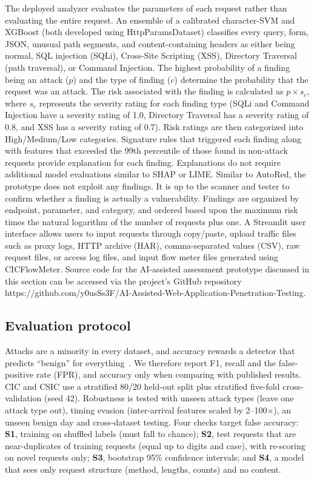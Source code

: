 \documentclass[conference]{IEEEtran}
\begin{document}
The deployed analyzer evaluates the parameters of each request rather than evaluating the entire request. An ensemble of a calibrated character-SVM and XGBoost (both developed using HttpParamsDataset) classifies every query, form, JSON, unusual path segments, and content-containing headers as either being normal, SQL injection (SQLi), Cross-Site Scripting (XSS), Directory Traversal (path traversal), or Command Injection. The highest probability of a finding being an attack ($p$) and the type of finding ($c$) determine the probability that the request was an attack. The risk associated with the finding is calculated as $p \times s_c$, where $s_c$ represents the severity rating for each finding type (SQLi and Command Injection have a severity rating of 1.0, Directory Traversal has a severity rating of 0.8, and XSS has a severity rating of 0.7). Risk ratings are then categorized into High/Medium/Low categories. Signature rules that triggered each finding along with features that exceeded the 99th percentile of those found in non-attack requests provide explanation for each finding. Explanations do not require additional model evaluations similar to SHAP or LIME\cite{fasla2026}. Similar to AutoRed\cite{khairmode2026}, the prototype does not exploit any findings. It is up to the scanner and tester to confirm whether a finding is actually a vulnerability. Findings are organized by endpoint, parameter, and category, and ordered based upon the maximum risk times the natural logarithm of the number of requests plus one. A Streamlit user interface allows users to input requests through copy/paste, upload traffic files such as proxy logs, HTTP archive (HAR), comma-separated values (CSV), raw request files, or access log files, and input flow meter files generated using CICFlowMeter. Source code for the AI-assisted assessment prototype discussed in this section can be accessed via the project's GitHub repository https://github.com/y0usSs3F/AI-Assisted-Web-Application-Penetration-Testing.

\subsection{Evaluation protocol}

Attacks are a minority in every dataset, and accuracy rewards a detector that predicts ``benign'' for everything~\cite{fasla2026}. We therefore report F1, recall and the false-positive rate (FPR), and accuracy only when comparing with published results. CIC and CSIC use a stratified 80/20 held-out split plus stratified five-fold cross-validation (seed 42). Robustness is tested with unseen attack types (leave one attack type out), timing evasion (inter-arrival features scaled by 2--100$\times$), an unseen benign day and cross-dataset testing. Four checks target false accuracy: \textbf{S1}, training on shuffled labels (must fall to chance); \textbf{S2}, test requests that are near-duplicates of training requests (equal up to digits and case), with re-scoring on novel requests only; \textbf{S3}, bootstrap 95\% confidence intervals; and \textbf{S4}, a model that sees only request structure (method, lengths, counts) and no content.
\end{document}
